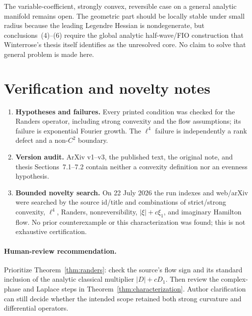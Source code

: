 \documentclass[11pt]{article}
\theoremstyle{remark}
\begin{document}
The variable-coefficient, strongly convex, reversible case on a general
analytic manifold remains open.  The geometric part should be locally stable
under small radius because the leading Legendre Hessian is nondegenerate, but
conclusions~(4)--(6) require the global analytic half-wave/FIO construction
that Winterrose's thesis itself identifies as the unresolved core.  No claim
to solve that general problem is made here.

\section{Verification and novelty notes}

\begin{enumerate}
\item \textbf{Hypotheses and failures.}  Every printed condition was checked
      for the Randers operator, including strong convexity and the flow
      assumptions; its failure is exponential Fourier growth.  The $\ell^4$
      failure is independently a rank defect and a non-$C^2$ boundary.
\item \textbf{Version audit.}  ArXiv v1--v3, the published text, the original
      note, and thesis Sections~7.1--7.2 contain neither a convexity definition
      nor an evenness hypothesis.
\item \textbf{Bounded novelty search.}  On 22 July 2026 the run indexes and
      web/arXiv were searched by the source id/title and combinations of
      strict/strong convexity, $\ell^4$, Randers, nonreversibility,
      $|\xi|+c\xi_1$, and imaginary Hamilton flow.  No prior counterexample or
      this characterization was found; this is not exhaustive certification.
\end{enumerate}

\paragraph{Human-review recommendation.}
Prioritize Theorem~\ref{thm:randers}: check the source's flow sign and its
standard inclusion of the analytic classical multiplier $|D|+cD_1$.  Then
review the complex-phase and Laplace steps in
Theorem~\ref{thm:characterization}.  Author clarification can still decide
whether the intended scope retained both strong curvature and differential
operators.
\end{document}
